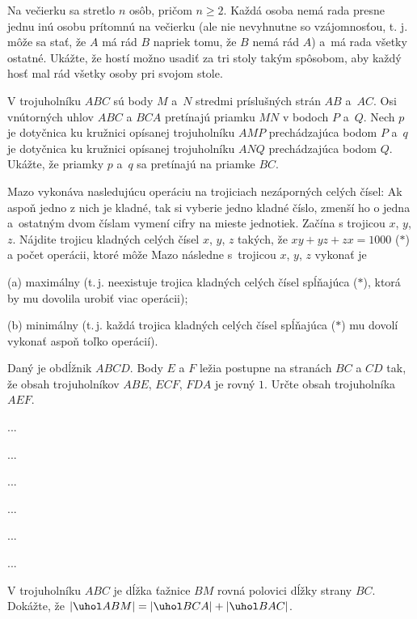 {%
Na večierku sa stretlo $n$ osôb, pričom $n\geq 2$. Každá osoba nemá rada presne jednu inú osobu prítomnú na večierku (ale nie nevyhnutne so vzájomnosťou, t. j. môže sa stať, že $A$ má rád $B$ napriek tomu, že $B$ nemá rád $A$) a~má rada všetky ostatné. Ukážte, že hostí možno usadiť za tri stoly takým spôsobom, aby každý hosť mal rád všetky osoby pri svojom stole.}

{%
V trojuholníku $ABC$ sú body $M$ a~$N$ stredmi príslušných strán $AB$ a~$AC$. Osi vnútorných uhlov $ABC$ a $BCA$ pretínajú priamku $MN$ v bodoch $P$ a~$Q$. Nech $p$ je dotyčnica ku kružnici opísanej trojuholníku $AMP$ prechádzajúca bodom $P$ a~$q$ je dotyčnica ku kružnici opísanej trojuholníku $ANQ$ prechádzajúca bodom $Q$. Ukážte, že priamky $p$ a~$q$ sa pretínajú na priamke $BC$.}

{%
Mazo vykonáva nasledujúcu operáciu na trojiciach nezáporných celých čísel: Ak aspoň jedno z nich je kladné, tak si vyberie jedno kladné číslo, zmenší ho o jedna a~ostatným dvom číslam vymení cifry na mieste jednotiek. Začína s trojicou $x$, $y$, $z$. Nájdite trojicu kladných celých čísel $x$, $y$, $z$ takých, že
$xy+yz+zx=1000$ ($\ast$) a počet operácii, ktoré môže Mazo následne s~trojicou $x$, $y$, $z$ vykonať je
\item{(a)} maximálny (t.\,j. neexistuje trojica kladných celých čísel spĺňajúca ($\ast$), ktorá by mu dovolila urobiť viac operácii);
\item{(b)} minimálny (t.\,j. každá trojica kladných celých čísel spĺňajúca ($\ast$) mu dovolí vykonať aspoň toľko operácií).\endgraf
}

{%
Daný je obdĺžnik $ABCD$. Body $E$ a $F$ ležia postupne na stranách $BC$ a $CD$ tak, že obsah trojuholníkov $ABE$, $ECF$, $FDA$ je rovný $1$. Určte obsah trojuholníka $AEF$.
}

{%
...}

{%
...}

{%
...}

{%
...}

{%
...}

{%
...}

{%
V trojuholníku $ABC$ je dĺžka ťažnice $BM$ rovná polovici dĺžky strany $BC$. Dokážte, že $|\uhol ABM| = |\uhol BCA| + |\uhol BAC|$.}

